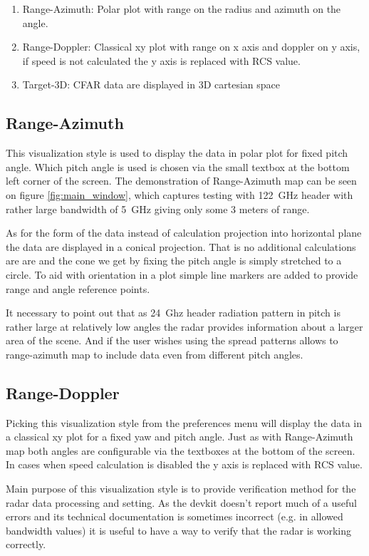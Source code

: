 \begin{enumerate}
	\item Range-Azimuth: Polar plot with range on the radius and azimuth on the angle.
	\item Range-Doppler: Classical xy plot with range on x axis and doppler on y axis, if speed is not calculated the y axis is replaced with RCS value.
	\item Target-3D: CFAR data are displayed in 3D cartesian space
\end{enumerate}

\subsection{Range-Azimuth}

This visualization style is used to display the data in polar plot for fixed pitch angle.
Which pitch angle is used is chosen via the small textbox at the bottom left corner of the screen.
The demonstration of Range-Azimuth map can be seen on figure \ref{fig:main_window}, which captures testing with 122~GHz header with rather large bandwidth of 5~GHz giving only some 3 meters of range.

As for the form of the data instead of calculation projection into horizontal plane the data are displayed in a conical projection.
That is no additional calculations are are and the cone we get by fixing the pitch angle is simply stretched to a circle.
To aid with orientation in a plot simple line markers are added to provide range and angle reference points.

It necessary to point out that as 24~Ghz header radiation pattern in pitch is rather large at relatively low angles the radar provides information about a larger area of the scene.
And if the user wishes using the spread patterns allows to range-azimuth map to include data even from different pitch angles.

\subsection{Range-Doppler}

Picking this visualization style from the preferences menu will display the data in a classical xy plot for a fixed yaw and pitch angle.
Just as with Range-Azimuth map both angles are configurable via the textboxes at the bottom of the screen.
In cases when speed calculation is disabled the y axis is replaced with RCS value.

Main purpose of this visualization style is to provide verification method for the radar data processing and setting.
As the devkit doesn't report much of a useful errors and its technical documentation is sometimes incorrect (e.g. in allowed bandwidth values) it is useful to have a way to verify that the radar is working correctly.

